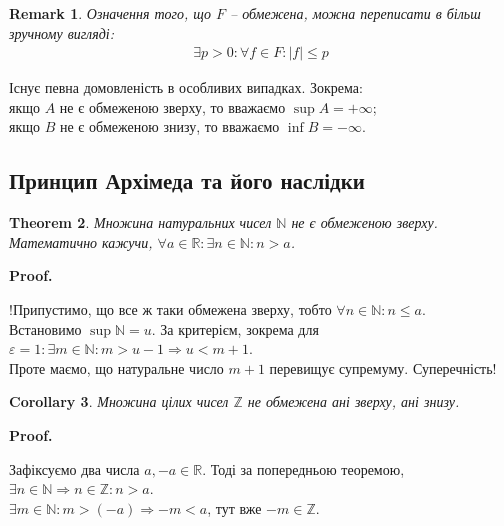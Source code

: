 \documentclass[a4paper, 14pt]{article}
\makeatletter
\def\qed{$\blacksquare$}
\theoremstyle{theoremdd}
\newtheorem{theorem}{Theorem}[subsection]
\theoremstyle{theoremdd}
\theoremstyle{theoremdd}
\theoremstyle{theoremdd}
\theoremstyle{theoremdd}
\theoremstyle{theoremdd}
\newtheorem{remark}[theorem]{Remark}
\theoremstyle{theoremdd}
\theoremstyle{theoremdd}
\newtheorem{corollary}[theorem]{Corollary}
\renewenvironment{proof}[1][Proof.\\]{\par
\pushQED{\hfill \qed}%
\normalfont \topsep6\p@\@plus6\p@\relax
\trivlist
\item\relax
{\bfseries
#1\@addpunct{.}}\hspace\labelsep\ignorespaces
}{%
\popQED\endtrivlist\@endpefalse
}
\makeatother
\begin{document}
	\begin{remark}
	Означення того, що $F$ -- обмежена, можна переписати в більш зручному вигляді:
	\begin{align*}
	\exists p>0: \forall f \in F: |f| \leq p
	\end{align*}
	\end{remark}
	
	Існує певна домовленість в особливих випадках. Зокрема:\\
	якщо $A$ не є обмеженою зверху, то вважаємо $\sup A = +\infty$;\\
	якщо $B$ не є обмеженою знизу, то вважаємо $\inf B = -\infty$.\\
	
	\subsection{Принцип Архімеда та його наслідки}
	\begin{theorem}
	Множина натуральних чисел $\mathbb{N}$ не є обмеженою зверху.\\
	Математично кажучи, $\forall a \in \mathbb{R}: \exists n \in \mathbb{N}: n > a$.
	\end{theorem}
	
	\begin{proof}
	!Припустимо, що все ж таки обмежена зверху, тобто $\forall n \in \mathbb{N}: n \leq a$.\\
	Встановимо $\displaystyle\sup \mathbb{N} = u$. За критерієм, зокрема для $\varepsilon = 1: \exists m \in \mathbb{N}: m > u-1 \Rightarrow u < m+1$.\\
	Проте маємо, що натуральне число $m+1$ перевищує супремуму. Суперечність!
	\end{proof}
	
	\begin{corollary}
	Множина цілих чисел $\mathbb{Z}$ не обмежена ані зверху, ані знизу.
	\end{corollary}
	
	\begin{proof}
	Зафіксуємо два числа $a,-a \in \mathbb{R}$. Тоді за попередньою теоремою,\\
	$\exists n \in \mathbb{N} \Rightarrow n \in \mathbb{Z}: n > a$.\\
	$\exists m \in \mathbb{N}: m > (-a) \Rightarrow -m < a$, тут вже $-m \in \mathbb{Z}$.
	\end{proof}
	
\end{document}
